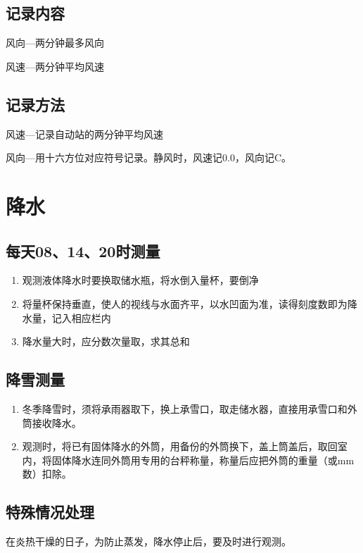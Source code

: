 ﻿\documentclass[UTF8,11pt]{ctexbook}%
\begin{document}
\subsection{记录内容}

风向---两分钟最多风向

风速---两分钟平均风速

\subsection{记录方法}

风速---记录自动站的两分钟平均风速 

风向---用十六方位对应符号记录。静风时，风速记0.0，风向记C。

\section{降水}

\subsection{每天08、14、20时测量}

\begin{enumerate}
	\item 观测液体降水时要换取储水瓶，将水倒入量杯，要倒净
	\item 将量杯保持垂直，使人的视线与水面齐平，以水凹面为准，读得刻度数即为降水量，记入相应栏内
	\item 降水量大时，应分数次量取，求其总和
\end{enumerate}

\subsection{降雪测量}

\begin{enumerate}
	\item 冬季降雪时，须将承雨器取下，换上承雪口，取走储水器，直接用承雪口和外筒接收降水。
	\item 观测时，将已有固体降水的外筒，用备份的外筒换下，盖上筒盖后，取回室内，将固体降水连同外筒用专用的台秤称量，称量后应把外筒的重量（或mm数）扣除。
\end{enumerate}

\subsection{特殊情况处理}

在炎热干燥的日子，为防止蒸发，降水停止后，要及时进行观测。
\end{document}
